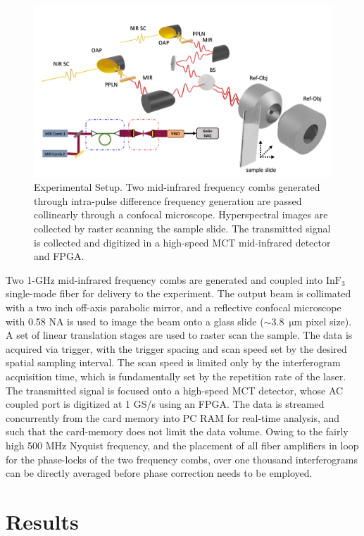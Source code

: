 \documentclass{optica-article}
\begin{document}
\begin{figure}[h]
    \centering
    \includegraphics[width=\linewidth]{setup_3D.png}
    \caption{Experimental Setup. Two mid-infrared frequency combs generated through intra-pulse difference frequency generation are passed collinearly through a confocal microscope. Hyperspectral images are collected by raster scanning the sample slide. The transmitted signal is collected and digitized in a high-speed MCT mid-infrared detector and FPGA.}
    \label{fig:setup}
\end{figure}

Two 1-GHz mid-infrared frequency combs are generated and coupled into $\mathrm{InF_3}$ single-mode fiber for delivery to the experiment. The output beam is collimated with a two inch off-axis parabolic mirror, and a reflective confocal microscope with 0.58 NA is used to image the beam onto a glass slide (\mbox{$\sim$3.8 $\mathrm{\mu m}$} pixel size). A set of linear translation stages are used to raster scan the sample. The data is acquired via trigger, with the trigger spacing and scan speed set by the desired spatial sampling interval. The scan speed is limited only by the interferogram acquisition time, which is fundamentally set by the repetition rate of the laser. The transmitted signal is focused onto a high-speed MCT detector, whose AC coupled port is digitized at 1 GS/s using an FPGA. The data is streamed concurrently from the card memory into PC RAM for real-time analysis, and such that the card-memory does not limit the data volume. Owing to the fairly high 500 MHz Nyquist frequency, and the placement of all fiber amplifiers in loop for the phase-locks of the two frequency combs, over one thousand interferograms can be directly averaged before phase correction needs to be employed.

\section{Results}
\end{document}
